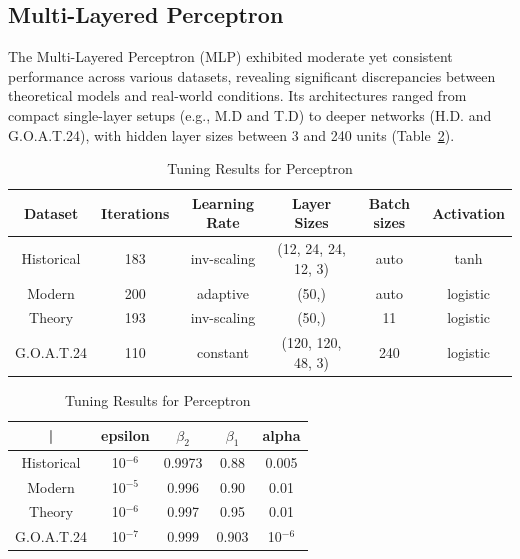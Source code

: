 \subsection{Multi-Layered Perceptron} \label{rlts:mlpr} The Multi-Layered Perceptron (MLP) exhibited moderate yet consistent performance across various datasets, revealing significant discrepancies between theoretical models and real-world conditions. Its architectures ranged from compact single-layer setups (e.g., M.D and T.D) to deeper networks (H.D. and G.O.A.T.24), with hidden layer sizes between 3 and 240 units (Table~\ref{tab:mlp_model_tuning}). \begin{table}[h!]
    \centering
        \begin{tabular}{||c|ccccc||}
            \hline 
            \textbf{Dataset} & \textbf{Iterations} & \textbf{Learning Rate} & \textbf{Layer Sizes} & \textbf{Batch sizes}  & \textbf{Activation}  \\
            \hline \hline 
            Historical & 183 & inv-scaling & (12, 24, 24, 12, 3) & auto & tanh \\[3pt] 
            Modern & 200 & adaptive & (50,) & auto & logistic \\[3pt] 
            Theory & 193 & inv-scaling & (50,) & 11 & logistic \\[3pt] 
            G.O.A.T.24 & 110 & constant & (120, 120, 48, 3) & 240 & logistic \\
            \hline
        \end{tabular}
        \begin{tabular}{||c|cccc||}
            \hline 
            | & epsilon & $\beta_2$ & $\beta_1$ & alpha \\
            \hline \hline
            Historical & 10$^{-6}$ &  0.9973 & 0.88 & 0.005 \\[3pt] 
            Modern & 10$^{-5}$ & 0.996 & 0.90 & 0.01 \\[3pt] 
            Theory & 10$^{-6}$ & 0.997 & 0.95 & 0.01 \\[3pt] 
            G.O.A.T.24 & 10$^{-7}$ & 0.999 & 0.903 & 10$^{-6}$ \\
            \hline
        \end{tabular}
    \caption{Tuning Results for Perceptron} 
    \label{tab:mlp_model_tuning}

\end{table}
